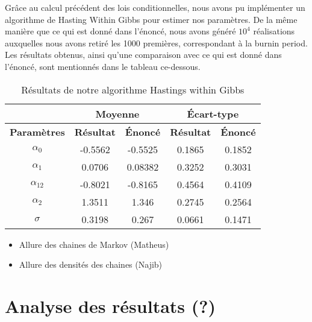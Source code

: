 \documentclass[
]{article}
\providecommand{\tightlist}{%
  \setlength{\itemsep}{0pt}\setlength{\parskip}{0pt}}
\begin{document}
Grâce au calcul précédent des lois conditionnelles, nous avons pu
implémenter un algorithme de Hasting Within Gibbs pour estimer nos
paramètres. De la même manière que ce qui est donné dans l'énoncé, nous
avons généré \(10^4\) réalisations auxquelles nous avons retiré les 1000
premières, correspondant à la burnin period. Les résultats obtenus,
ainsi qu'une comparaison avec ce qui est donné dans l'énoncé, sont
mentionnés dans le tableau ce-dessous.

\begin{table}[h]
\centering
\small
\begin{minipage}{0.45\textwidth}
\centering
\begin{tabular}{|c|c|c|c|c|}
\hline
\multicolumn{1}{|c|}{} &
\multicolumn{2}{|c|}{\textbf{Moyenne}} & \multicolumn{2}{|c|}{\textbf{Écart-type}} \\
\hline
\textbf{Paramètres} & \textbf{Résultat} & \textbf{Énoncé} & \textbf{Résultat} & \textbf{Énoncé} \\
\hline
$\alpha_0$ & -0.5562 & -0.5525 & 0.1865 & 0.1852 \\
$\alpha_1$ & 0.0706 & 0.08382 & 0.3252 & 0.3031 \\
$\alpha_{12}$ & -0.8021 & -0.8165 & 0.4564 & 0.4109 \\
$\alpha_2$ & 1.3511 & 1.346 & 0.2745 & 0.2564 \\
$\sigma$ & 0.3198 & 0.267 & 0.0661 & 0.1471 \\
\hline
\end{tabular}
\caption{Résultats de notre algorithme Hastings within Gibbs}
\end{minipage}
\end{table}

\begin{itemize}
\tightlist
\item
  Allure des chaines de Markov (Matheus)
\item
  Allure des densités des chaines (Najib)
\end{itemize}

\hypertarget{analyse-des-ruxe9sultats}{%
\section{Analyse des résultats (?)}\label{analyse-des-ruxe9sultats}}
\end{document}
